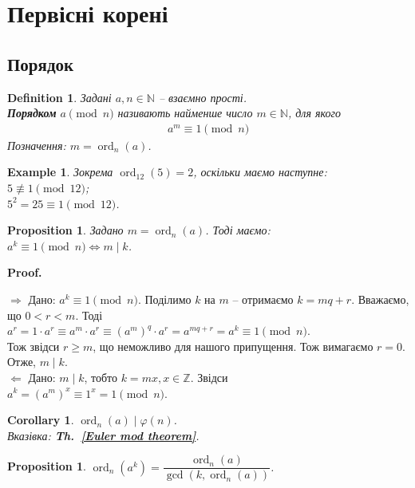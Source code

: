 \documentclass[a4paper, 10pt]{article}
\makeatletter
\theoremstyle{theoremdd}
\theoremstyle{theoremdd}
\newtheorem{definition}[theorem]{Definition}
\theoremstyle{theoremdd}
\theoremstyle{theoremdd}
\newtheorem{example}[theorem]{Example}
\theoremstyle{theoremdd}
\newtheorem{proposition}[theorem]{Proposition}
\theoremstyle{theoremdd}
\theoremstyle{theoremdd}
\theoremstyle{theoremdd}
\newtheorem{corollary}[theorem]{Corollary}
\def\rightproof{$\boxed{\Rightarrow}$ }
\def\leftproof{$\boxed{\Leftarrow}$ }
\renewenvironment{proof}[1][Proof.\\]{\par
\pushQED{\hfill \qed}%
\normalfont \topsep6\p@\@plus6\p@\relax
\trivlist
\item\relax
{\bfseries
#1\@addpunct{.}}\hspace\labelsep\ignorespaces
}{%
\popQED\endtrivlist\@endpefalse
}
\DeclareMathOperator{\ord}{ord}
\newcommand\thref[1]{\textbf{Th.~\ref{#1}}}
\makeatother
\begin{document}
\section{Первісні корені}

\subsection{Порядок}
\begin{definition}
Задані $a,n \in \mathbb{N}$ -- взаємно прості.\\
\textbf{Порядком} $a \pmod n$ називають найменше число $m \in \mathbb{N}$, для якого
\begin{align*}
a^m \equiv 1 \pmod n
\end{align*}
Позначення: $m = \ord_n(a)$.
\end{definition}

\begin{example}
Зокрема $\ord_{12}(5) = 2$, оскільки маємо наступне:\\
$5 \not \equiv 1 \pmod {12}$;\\
$5^2 = 25 \equiv 1 \pmod {12}$.
\end{example}

\begin{proposition}
\label{order_and_numbers_bigger_than_order}
Задано $m = \ord_n(a)$. Тоді маємо:\\
$a^k \equiv 1 \pmod n \iff m \mid k$.
\end{proposition}

\begin{proof}
\rightproof Дано: $a^k \equiv 1 \pmod n$. Поділимо $k$ на $m$ -- отримаємо $k = mq +r$. Вважаємо, що $0 < r < m$. Тоді\\
$a^r = 1 \cdot a^r \equiv a^m \cdot a^r \equiv (a^m)^q \cdot a^r = a^{mq+r} = a^k \equiv 1 \pmod n$.\\
Тож звідси $r \geq m$, що неможливо для нашого припущення. Тож вимагаємо $r = 0$. Отже, $m \mid k$.
\bigskip \\
\leftproof Дано: $m \mid k$, тобто $k = mx, x \in \mathbb{Z}$. Звідси\\
$a^k = (a^m)^x \equiv 1^x = 1 \pmod n$.
\end{proof}

\begin{corollary}
$\ord_n(a) \mid \varphi(n)$.\\
\textit{Вказівка:} \thref{Euler mod theorem}.
\end{corollary}

\begin{proposition}
$\ord_n (a^k) = \dfrac{\ord_n (a)}{\gcd(k,\ord_n (a))}$.
\end{proposition}
\end{document}
